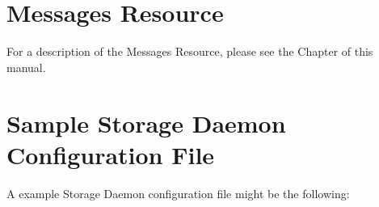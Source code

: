 \section{Messages Resource}
\label{MessagesResource1}

For a description of the Messages Resource, please see the 
 Chapter of this
manual. 

\section{Sample Storage Daemon Configuration File}
\label{SampleConfiguration}

A example Storage Daemon configuration file might be the following: 

